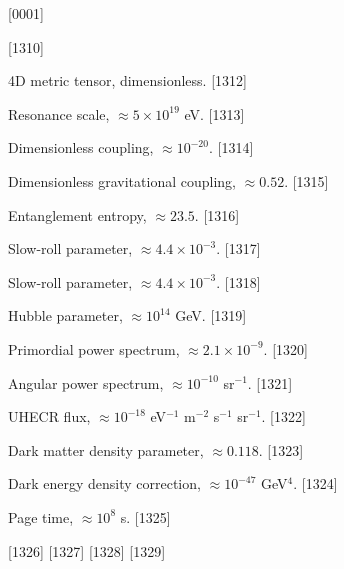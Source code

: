 [0001] \documentclass[12pt]{report}
[0002] \usepackage[utf8]{inputenc}
\begin{document}
[1310] \begin{description}
[1311] \item[$g_{\mu\nu}$] 4D metric tensor, dimensionless.
[1312] \item[$\Lambda$] Resonance scale, $\approx 5 \times 10^{19}$ eV.
[1313] \item[$\xi$] Dimensionless coupling, $\approx 10^{-20}$.
[1314] \item[$\tilde{G}$] Dimensionless gravitational coupling, $\approx 0.52$.
[1315] \item[$S_{\text{ent}}$] Entanglement entropy, $\approx 23.5$.
[1316] \item[$\epsilon$] Slow-roll parameter, $\approx 4.4 \times 10^{-3}$.
[1317] \item[$\eta$] Slow-roll parameter, $\approx 4.4 \times 10^{-3}$.
[1318] \item[$H$] Hubble parameter, $\approx 10^{14}$ GeV.
[1319] \item[$P(k)$] Primordial power spectrum, $\approx 2.1 \times 10^{-9}$.
[1320] \item[$C_l$] Angular power spectrum, $\approx 10^{-10}$ sr$^{-1}$.
[1321] \item[$J(E)$] UHECR flux, $\approx 10^{-18}$ eV$^{-1}$ m$^{-2}$ s$^{-1}$ sr$^{-1}$.
[1322] \item[$\Omega h^2$] Dark matter density parameter, $\approx 0.118$.
[1323] \item[$\Delta \rho_\Lambda$] Dark energy density correction, $\approx 10^{-47}$ GeV$^4$.
[1324] \item[$\tau_{\text{Page}}$] Page time, $\approx 10^8$ s.
[1325] \end{description}
[1326] 
[1327] 
[1328] 
[1329] 
\end{document}
